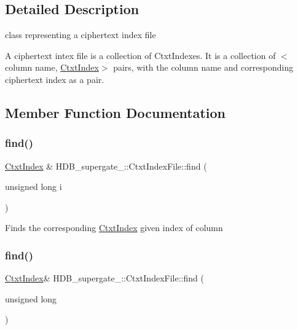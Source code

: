 \subsection{Detailed Description}
class representing a ciphertext index file 

A ciphertext intex file is a collection of Ctxt\+Indexes. It is a collection of $<$column name, \hyperlink{classHDB__supergate___1_1CtxtIndex}{Ctxt\+Index}$>$ pairs, with the column name and corresponding ciphertext index as a pair. 

\subsection{Member Function Documentation}
\mbox{\label{classHDB__supergate___1_1CtxtIndexFile_a52792f06177d60f6580a664f24b706ee}} 
\subsubsection{\texorpdfstring{find()}{find()}\hspace{0.1cm}{\footnotesize\ttfamily [1/4]}}
{\footnotesize\ttfamily \hyperlink{classHDB__supergate___1_1CtxtIndex}{Ctxt\+Index} \& H\+D\+B\+\_\+supergate\+\_\+\+::\+Ctxt\+Index\+File\+::find (\begin{DoxyParamCaption}\item[{unsigned long}]{i }\end{DoxyParamCaption})}

Finds the corresponding \hyperlink{classHDB__supergate___1_1CtxtIndex}{Ctxt\+Index} given index of column \mbox{\label{classHDB__supergate___1_1CtxtIndexFile_a22e64dc85f8e2ec050ee00820d31d083}} 
\subsubsection{\texorpdfstring{find()}{find()}\hspace{0.1cm}{\footnotesize\ttfamily [2/4]}}
{\footnotesize\ttfamily \hyperlink{classHDB__supergate___1_1CtxtIndex}{Ctxt\+Index}\& H\+D\+B\+\_\+supergate\+\_\+\+::\+Ctxt\+Index\+File\+::find (\begin{DoxyParamCaption}\item[{unsigned}]{long }\end{DoxyParamCaption})}

